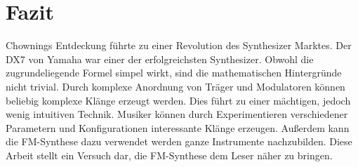 \section{Fazit}

Chownings Entdeckung führte zu einer Revolution des Synthesizer Marktes. Der DX7 von Yamaha war einer der erfolgreichsten Synthesizer. Obwohl die zugrundeliegende Formel simpel wirkt, sind die mathematischen Hintergründe nicht trivial. Durch komplexe Anordnung von Träger und Modulatoren können beliebig komplexe Klänge erzeugt werden. Dies führt zu einer mächtigen, jedoch wenig intuitiven Technik. Musiker können durch Experimentieren verschiedener Parametern und Konfigurationen interessante Klänge erzeugen. Außerdem kann die FM-Synthese dazu verwendet werden ganze Instrumente nachzubilden.
Diese Arbeit stellt ein Versuch dar, die FM-Synthese dem Leser näher zu bringen.